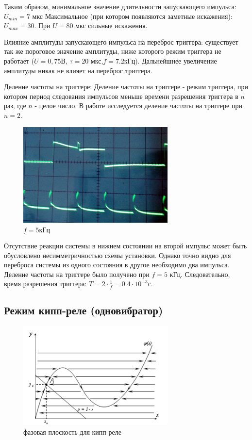 \documentclass[a4paper,14pt]{extarticle}
\begin{document}
Таким образом, минимальное значение длительности запускающего импульса: $U_{min} = 7$ мкс
Максимальное (при котором появляются заметные искажения): $U_{max} = 30$. При $U = 80$ мкс сильные искажения. 


Влияние амплитуды запускающего импульса на переброс триггера: существует так же пороговое значение амплитуды, ниже которого режим триггера не работает ($U = 0,75$В, $\tau = 20$ мкс,$f = 7.2$кГц). Дальнейшнее увеличение амплитуды никак не влияет на переброс триггера.

Деление частоты на триггере:
Деление частоты на триггере - режим триггера, при котором период следования импульсов меньше времени разрешения триггера в $n$ раз, где $n$ - целое число. В работе исследуется деление частоты на триггере при $n = 2$.
  
\begin{figure}[H]
	\centering
	\includegraphics[width=0.7\textwidth]{photo/del_f}
	\caption{$f = 5$кГц}
	\label{fig:figure2}
\end{figure}

Отсутствие реакции системы в нижнем состоянии на второй импульс может быть обусловлено несимметричностью схемы установки. Однако точно видно для переброса системы из одного состояния в другое необходимо два импульса. Деление частоты на триггере было получено при $f = 5$ кГц. Следовательно, время разрешения триггера: $T = 2 \cdot \frac{1}{f} = 0.4 \cdot 10^{-3}$с. 

\subsection{Режим кипп-реле (одновибратор)}
\begin{figure}[H]
	\centering
	\includegraphics[width=0.7\textwidth]{photo/kipp}
	\caption{фазовая плоскость для кипп-реле}
	\label{fig:figure2}
\end{figure}
\end{document}
